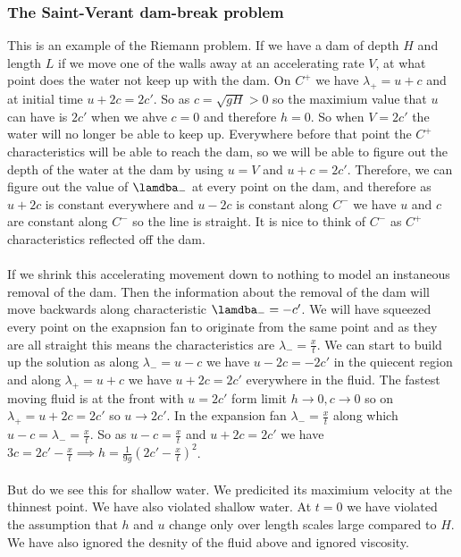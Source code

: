 \documentclass{article}
\begin{document}
\subsubsection{The Saint-Verant dam-break problem}
This is an example of the Riemann problem. If we have a dam of depth $H$ and length $L$ if we move one of the walls away at an accelerating rate $V$, at what point does the water not keep up with the dam.
On $C^+$ we have $\lambda_+ = u+c$ and at initial time $u + 2c = 2 c'$. So as $c= \sqrt{gH} >0$ so the maximium value that $u$ can have is $2c'$ when we ahve $c=0$ and therefore $h=0$. So when $V = 2c'$ the water will no longer be able to keep up. Everywhere before that point the $C^+$ characteristics will be able to reach the dam, so we will be able to figure out the depth of the water at the dam by using $u= V$ and $u+c = 2c'$. Therefore, we can figure out the value of $\lamdba_-$ at every point on the dam, and therefore as $u+2c$ is constant everywhere and $u-2c$ is constant along $C^-$ we have $u$ and $c$ are constant along $C^-$ so the line is straight. It is nice to think of $C^-$ as $C^+$ characteristics reflected off the dam.\\\\
If we shrink this accelerating movement down to nothing to model an instaneous removal of the dam. Then the information about the removal of the dam will move backwards along characteristic $\lamdba_- = - c'$. We will have squeezed every point on the exapnsion fan to originate from the same point and as they are all straight this means the characteristics are $\lambda_- = \frac{x}{t}$. We can start to build up the solution as along $\lambda_- = u-c$ we have $u-2c = -2c'$ in the quiecent region and along $\lambda_+ = u+c$ we have $u+2c = 2c'$ everywhere in the fluid. The fastest moving fluid is at the front with $u = 2 c'$ form limit $h \rightarrow 0, c \rightarrow 0$ so on $\lambda_+ = u + 2c = 2c'$ so $u \rightarrow 2 c'$. In the expansion fan $\lambda_- = \frac{x}{t}$ along which $u-c = \lambda_- = \frac{x}{t}$. So as $u -c = \frac{x}{t}$ and $u+ 2c = 2c'$ we have $3c = 2 c' - \frac{x}{t} \implies h = \frac{1}{9g} ( 2c' - \frac{x}{t})^2$.\\\\
But do we see this for shallow water. We predicited its maximium velocity at the thinnest point. We have also violated shallow water. At $t=0$ we have violated the assumption that $h$ and $u$ change only over length scales large compared to $H$. We have also ignored the desnity of the fluid above and ignored viscosity. \\
\end{document}
